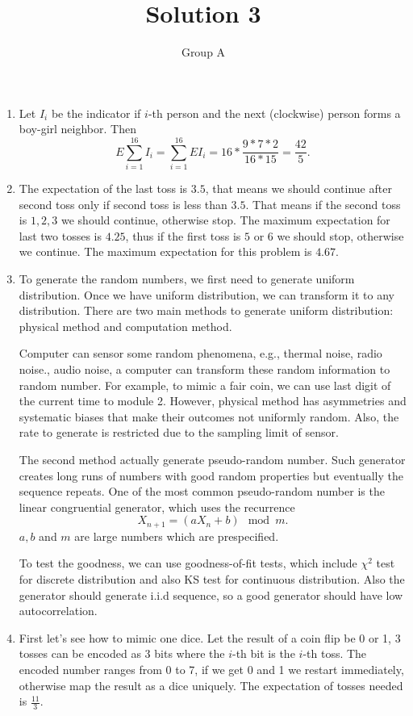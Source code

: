 \documentclass[10pt, onecolumn, draftcls]{IEEEtran}
\begin{document}
\title{Solution 3}
\author{Group A}
\maketitle


\begin{enumerate}
\item
Let $I_i$ be the indicator if $i$-th person and the next (clockwise) person forms a boy-girl neighbor. Then
$$E\sum_{i=1}^{16}I_i=\sum_{i=1}^{16} EI_i=16*\frac{9*7*2}{16*15}=\frac{42}{5}.$$
\item
The expectation of the last toss is $3.5$, that means we should continue after second toss only if second toss is less than $3.5$. That means if the second toss is $1,2,3$ we should continue, otherwise stop. The maximum expectation for last two tosses is $4.25$, thus if the first toss is $5$ or $6$ we should stop, otherwise we continue. The maximum expectation for this problem is $4.67$.
\item
To generate the random numbers, we first need to generate uniform distribution. Once we have uniform distribution, we can transform it to any distribution. There are two main methods to generate uniform distribution: physical method and computation method. 

Computer can sensor some random phenomena, e.g., thermal noise, radio noise., audio noise, a computer can transform these random information to random number. For example, to mimic a fair coin, we can use last digit of the current time to module 2. However, physical method has asymmetries and systematic biases that make their outcomes not uniformly random. Also, the rate to generate is restricted due to the sampling limit of sensor. 

The second method actually generate pseudo-random number. Such generator creates long runs of numbers with good random properties but eventually the sequence repeats. One of the most common pseudo-random number is the linear congruential generator, which uses the recurrence
$$X_{n+1}=(aX_n+b)\mod m.$$
$a,b$ and $m$ are large numbers which are prespecified.

To test the goodness, we can use goodness-of-fit tests, which include $\chi^2$ test for discrete distribution and also KS test for continuous distribution. Also the generator should generate i.i.d sequence, so a good generator should have low autocorrelation.
\item
First let's see how to mimic one dice. Let the result of a coin flip be 0 or 1, 3 tosses can be encoded as 3 bits where the $i$-th bit is the $i$-th toss. The encoded number ranges from 0 to 7, if we get 0 and 1 we restart immediately, otherwise map the result as a dice uniquely. The expectation of tosses needed is $\frac{11}{3}.$ 


\end{enumerate}
\end{document}
